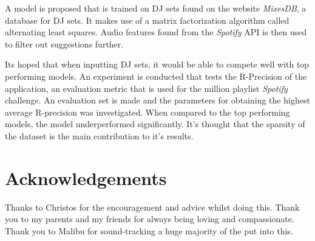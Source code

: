 A model is proposed that is trained on DJ sets found on the website \textit{MixesDB}, a database for DJ sets. It makes use of a matrix factorization algorithm called alternating least squares. Audio features found from the \textit{Spotify} API is then used to filter out suggestions further. 

Its hoped that when inputting DJ sets, it would be able to compete well with top performing models. An experiment is conducted that tests the R-Precision of the application, an evaluation metric that is used for the million playlist \textit{Spotify} challenge. An evaluation set is made and the parameters for obtaining the highest average R-precision was investigated. When compared to the top performing models, the model underperformed significantly. It's thought that the sparsity of the dataset is the main contribution to it's results.  

\frontmatter

\singlespacing

\setlength{\parskip}{0ex} %

\clearpage
{}
\tableofcontents
\clearpage
{}
{}
\listoffigures
\clearpage
{}
{}


\setlength{\parskip}{1ex plus 0.2ex minus 0.2ex} %

\onehalfspacing

\chapter{Acknowledgements}

Thanks to Christos for the encouragement and advice whilst doing this. Thank you to my parents and my friends for always being loving and compassionate. Thank you to Malibu for sound-tracking a huge majority of the put into this.
